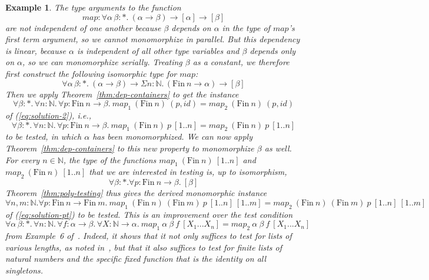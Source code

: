 \documentclass{article}[12 pt]
\newtheorem{example}{Example}
\theoremstyle{problemstyle}
\begin{document}
\begin{example}\label{ex:map}
The type arguments to the function
\begin{displaymath}
\mathit{map} : \forall \alpha \, \beta : *.~(\alpha \to \beta) \to
       [\alpha] \to [\beta]
\end{displaymath}
\noindent
are not independent of one another because $\beta$ depends on $\alpha$
in the type of $\mathit{map}$'s first term argument, so we cannot
monomorphize in parallel. But this dependency is linear, because
$\alpha$ is independent of all other type variables and $\beta$
depends only on $\alpha$, so we can monomorphize serially. Treating
$\beta$ as a constant, we therefore first construct the following
isomorphic type for $\mathit{map}$:
\begin{displaymath}
\forall \alpha \,\beta : *.~(\alpha \to \beta) \to \Sigma n:
\mathbb{N}.\, (\mathrm{Fin}~n \to \alpha) \to [\beta]
\end{displaymath}
\noindent
Then we apply Theorem~\ref{thm:dep-containers} to get the instance
\begin{displaymath}
\forall \beta : *. \, \forall n: \mathbb{N}. \, \forall p :
\mathrm{Fin}~n \to
\beta.~\mathit{map}_1~(\mathrm{Fin}~n)~(p,\mathit{id}) =
\mathit{map}_2~(\mathrm{Fin}~n)~(p,\mathit{id})
\end{displaymath}
of (\ref{eq:solution-2}), i.e., 
\begin{displaymath}
\forall \beta : *. \, \forall n: \mathbb{N}. \, \forall p :
\mathrm{Fin}~n \to
\beta.~\mathit{map}_1~(\mathrm{Fin}~n)~p~[1..n] =
\mathit{map}_2~(\mathrm{Fin}~n)~p~[1..n]
\end{displaymath}
\noindent
to be tested, in which $\alpha$ has been monomorphized. We can now
apply Theorem~\ref{thm:dep-containers} to this new property to
monomorphize $\beta$ as well. For every $n \in \mathbb{N}$, the type
of the functions $\mathit{map}_1~(\mathrm{Fin}~n)~[1..n]$ and
$\mathit{map}_2~(\mathrm{Fin}~n)~[1..n]$ that we are interested in
testing is, up to isomorphism,
\begin{displaymath}
\forall \beta : *. \forall p : \mathrm{Fin}~n \to \beta.\ [\beta]
\end{displaymath}
\noindent
Theorem~\ref{thm:poly-testing} thus gives the derived monomorphic
instance
\begin{displaymath}
\forall n, m : \mathbb{N}. \forall p : \mathrm{Fin}~n \rightarrow
\mathrm{Fin}~m .\
\mathit{map}_1~(\mathrm{Fin}~n)~(\mathrm{Fin}~m)~p~[1..n]~[1..m] =
\mathit{map}_2~(\mathrm{Fin}~n)~(\mathrm{Fin}~m)~p~[1..n]~[1..m]
\end{displaymath}
of (\ref{eq:solution-pt}) to be tested. This is an improvement over
the test condition
\[ \forall \alpha \, \beta :
*. \, \forall n : \mathbb{N}. \, \forall f : \alpha \rightarrow
\beta. \, \forall X : \mathbb{N} \rightarrow
\alpha.~\mathit{map}_1~\alpha~\beta~f~[X_1...X_n] =
\mathit{map}_2~\alpha~\beta~f~[X_1...X_n]\] from Example~6
of~\cite{bjc10}. Indeed, it shows that it not only suffices to test
for lists of various lengths, as noted in~\cite{bjc10}, but that it
also suffices to test for finite lists of natural numbers and the
specific fixed function that is the identity on all singletons.
\end{example}
\end{document}
